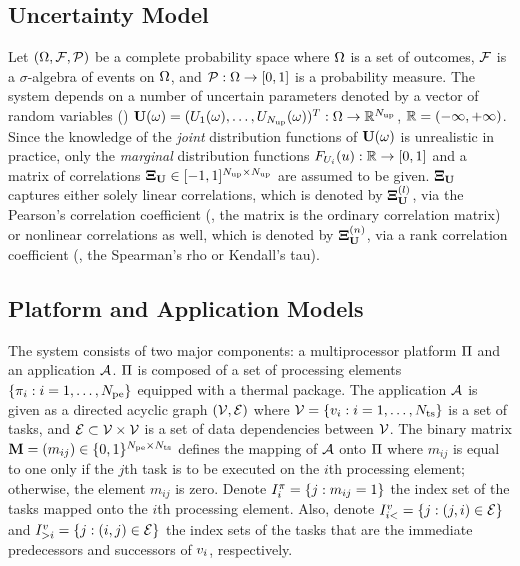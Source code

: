 \subsection{Uncertainty Model} 
Let $(\Omega, \mathcal{F}, \mathcal{P})$ be a complete probability space \cite{durrett2010} where $\Omega$ is a set of outcomes, $\mathcal{F}$ is a $\sigma$-algebra of events on $\Omega$, and $\mathcal{P}: \Omega \to [0, 1]$ is a probability measure. The system depends on a number of uncertain parameters denoted by a vector of random variables (\rvs) $\mathbf{U}(\omega) = (U_1(\omega), \dots, U_{N_\text{up}}(\omega))^T: \Omega \to \mathbb{R}^{N_\text{up}}$, $\mathbb{R} = (-\infty, +\infty)$. Since the knowledge of the \emph{joint} distribution functions of $\mathbf{U}(\omega)$ is unrealistic in practice, only the \emph{marginal} distribution functions $F_{U_i}(u): \mathbb{R} \to [0, 1]$ and a matrix of correlations $\mathbf{\Xi}_{\mathbf{U}} \in [-1, 1]^{{N_\text{up}} \times {N_\text{up}}}$ are assumed to be given. $\mathbf{\Xi}_{\mathbf{U}}$ captures either solely linear correlations, which is denoted by $\mathbf{\Xi}^{(l)}_{\mathbf{U}}$, via the Pearson's correlation coefficient (\ie, the matrix is the ordinary correlation matrix) or nonlinear correlations as well, which is denoted by $\mathbf{\Xi}^{(n)}_{\mathbf{U}}$, via a rank correlation coefficient (\eg, the Spearman's rho or Kendall's tau).

\subsection{Platform and Application Models}  
The system consists of two major components: a multiprocessor platform $\Pi$ and an application $\mathcal{A}$. $\Pi$ is composed of a set of processing elements $\{ \pi_i: i = 1, \dots, {N_\text{pe}} \}$ equipped with a thermal package. The application $\mathcal{A}$ is given as a directed acyclic graph $(\mathcal{V}, \mathcal{E})$ where $\mathcal{V} = \{ v_i: i = 1, \dots, {N_\text{ts}} \}$ is a set of tasks, and $\mathcal{E} \subset \mathcal{V} \times \mathcal{V}$ is a set of data dependencies between $\mathcal{V}$. The binary matrix $\mathbf{M} = (m_{ij}) \in \{ 0, 1 \}^{{N_\text{pe}} \times {N_\text{ts}}}$ defines the mapping of $\mathcal{A}$ onto $\Pi$ where $m_{ij}$ is equal to one only if the $j$th task is to be executed on the $i$th processing element; otherwise, the element $m_{ij}$ is zero. Denote $I^\pi_i = \{ j: m_{ij} = 1 \}$ the index set of the tasks mapped onto the $i$th processing element. Also, denote $I^v_{i<} = \{ j: (j, i) \in \mathcal{E} \}$ and $I^v_{>i} = \{ j: (i, j) \in \mathcal{E} \}$ the index sets of the tasks that are the immediate predecessors and successors of $v_i$, respectively.

